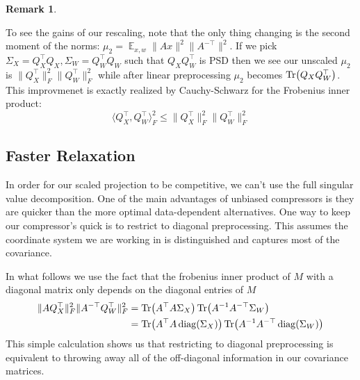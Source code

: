 \documentclass{article}
\theoremstyle{definition}
\newtheorem{remark}[theorem]{Remark}
\theoremstyle{plain}
\DeclareMathOperator{\E}{\mathbb{E}}
\DeclarePairedDelimiter\parentheses{\lparen}{\rparen}
\newcommand{\Tr}[1]{\operatorname{Tr} \parentheses*{#1}}
\newcommand{\diag}[1]{\operatorname{diag} \parentheses*{#1}}
\begin{document}
\begin{remark} \label{remark:singular}


To see the gains of our rescaling, note that the only thing changing is the second moment of the norms: $\mu_2 = \E_{x,w} \|Ax\|^2 \|A^{-\top}\|^2$. If we pick $\Sigma_X = Q_X^\top Q_X, \Sigma_W = Q_W^\top Q_W$ such that $Q_X Q_W^\top$ is PSD then we see our unscaled $\mu_2$ is $\|Q_X^\top\|_F^2 \|Q_W^\top\|_F^2$ while after linear preprocessing $\mu_2$ becomes $\Tr{Q_X Q_W^\top}$. This improvmenet is exactly realized by Cauchy-Schwarz for the Frobenius inner product:
\[ \langle Q_X^\top, Q_W^\top \rangle_F^2 \leq \|Q_X^\top\|_F^2 \|Q_W^\top\|_F^2 \]



\end{remark}

\subsection{Faster Relaxation}
In order for our scaled projection to be competitive, we can't use the full singular value decomposition. One of the main advantages of unbiased compressors is they are quicker than the more optimal data-dependent alternatives. One way to keep our compressor's quick is to restrict to diagonal preprocessing. This assumes the coordinate system we are working in is distinguished and captures most of the covariance.

In what follows we use the fact that the frobenius inner product of $M$ with a diagonal matrix only depends on the diagonal entries of $M$
\begin{align*}
\|A Q_X^\top \|_F^2 \|A^{-\top} Q_W^\top \|_F^2 &= \Tr{A^\top A \Sigma_X} \Tr{A^{-1} A^{-\top} \Sigma_W} \\ 
&= \Tr{A^\top A \diag{\Sigma_X}} \Tr{A^{-1} A^{-\top} \diag{\Sigma_W}}  \\
\end{align*}
This simple calculation shows us that restricting to diagonal preprocessing is equivalent to throwing away all of the off-diagonal information in our covariance matrices.
\end{document}
